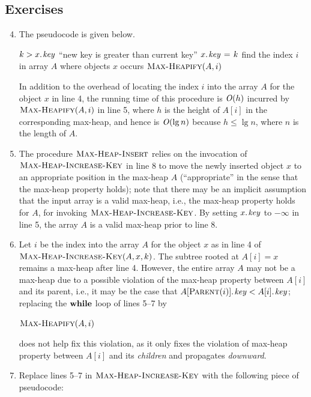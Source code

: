 \subsection*{Exercises}
\begin{enumerate}[\thesection-1]
%
\setcounter{enumi}{3}
%
\item The pseudocode is given below.
\begin{codebox}
\li \If $k > \attrib{x}{key}$
\li \Then
              \Error ``new key is greater than current key''
    \End
\li $\attrib{x}{key} \gets k$
\li find the index $i$ in array $A$ where objects $x$ occurs
\li $\textnormal{\scshape Max-Heapify}(A, i)$
\end{codebox}

In addition to the overhead of locating the index $i$ into the array $A$ for the object $x$ in line 4, the running time of this procedure is $\mathit{O}\!\left(h\right)$ incurred by $\textnormal{\scshape Max-Heapify}(A, i)$ in line 5, where $h$ is the height of $A[i]$ in the corresponding max-heap, and hence is $\mathit{O}\!\left(\lg n\right)$ because $h \leq \lg n$, where $n$ is the length of $A$.
%
\item The procedure $\textnormal{\scshape Max-Heap-Insert}$ relies on the invocation of $\textnormal{\scshape Max-Heap-Increase-Key}$ in line 8 to move the newly inserted object $x$ to an appropriate position in the max-heap $A$ (``appropriate'' in the sense that the max-heap property holds); note that there may be an implicit assumption that the input array is a valid max-heap, i.e., the max-heap property holds for $A$, for invoking $\textnormal{\scshape Max-Heap-Increase-Key}$. By setting $\attrib{x}{key}$ to $-\infty$ in line 5, the array $A$ is a valid max-heap prior to line 8.
%
\item Let $i$ be the index into the array $A$ for the object $x$ as in line 4 of $\textnormal{\scshape Max-Heap-Increase-Key}(A, x, k)$. The subtree rooted at $A[i] = x$ remains a max-heap after line 4. However, the entire array $A$ may not be a max-heap due to a possible violation of the max-heap property between $A[i]$ and its parent, i.e., it may be the case that $\attrib{A[\proc{Parent}(i)]}{key} < \attrib{A[i]}{key}$; replacing the $\textbf{while}$ loop of lines 5--7 by
\begin{codebox}
\li $\textnormal{\scshape Max-Heapify}(A, i)$
\end{codebox}
does not help fix this violation, as it only fixes the violation of max-heap property between $A[i]$ and its \emph{children} and propagates \emph{downward}.
%
\setcounter{enumi}{7}
%
\item Replace lines 5--7 in $\textnormal{\scshape Max-Heap-Increase-Key}$ with the following piece of pseudocode:

\end{enumerate}
